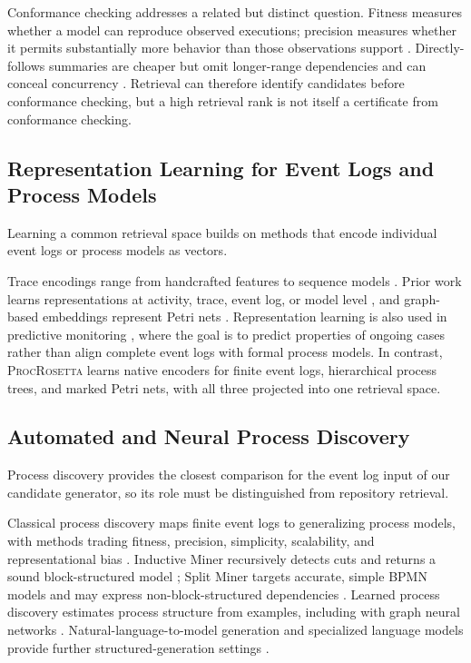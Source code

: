 \documentclass[mathematics,article,submit,moreauthors]{Definitions/mdpi}
\newcommand{\model}{\textsc{ProcRosetta}\xspace}
\begin{document}
Conformance checking addresses a related but distinct question. Fitness measures whether a model can reproduce observed executions; precision measures whether it permits substantially more behavior than those observations support \cite{Adriansyah2013}. Directly-follows summaries are cheaper but omit longer-range dependencies and can conceal concurrency \cite{vanDerAalst2019DFG}. Retrieval can therefore identify candidates before conformance checking, but a high retrieval rank is not itself a certificate from conformance checking.

\subsection{Representation Learning for Event Logs and Process Models}

Learning a common retrieval space builds on methods that encode individual event logs or process models as vectors.

Trace encodings range from handcrafted features to sequence models \cite{Barbon2023}. Prior work learns representations at activity, trace, event log, or model level \cite{DeKoninck2018}, and graph-based embeddings represent Petri nets \cite{Colonna2024}. Representation learning is also used in predictive monitoring \cite{Berti2026ICFM}, where the goal is to predict properties of ongoing cases rather than align complete event logs with formal process models. In contrast, \model learns native encoders for finite event logs, hierarchical process trees, and marked Petri nets, with all three projected into one retrieval space.

\subsection{Automated and Neural Process Discovery}

Process discovery provides the closest comparison for the event log input of our candidate generator, so its role must be distinguished from repository retrieval.

Classical process discovery maps finite event logs to generalizing process models, with methods trading fitness, precision, simplicity, scalability, and representational bias \cite{Augusto2019DiscoveryBenchmark}. Inductive Miner recursively detects cuts and returns a sound block-structured model \cite{Leemans2013}; Split Miner targets accurate, simple BPMN models and may express non-block-structured dependencies \cite{Augusto2019SplitMiner}. Learned process discovery estimates process structure from examples, including with graph neural networks \cite{Sommers2023}. Natural-language-to-model generation and specialized language models provide further structured-generation settings \cite{Kourani2024LLMProcessModeling,Berti2025RLProcessModeling}.
\end{document}

